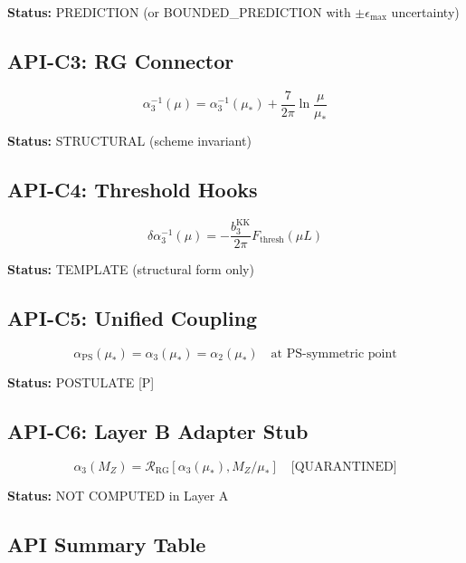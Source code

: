 \documentclass[11pt,a4paper]{article}
\theoremstyle{definition}
\begin{document}
\textbf{Status:} PREDICTION (or BOUNDED\_PREDICTION with $\pm\epsilon_{\max}$ uncertainty)

\subsection{API-C3: RG Connector}
\label{subsec:api-c3}

\begin{equation}
\label{eq:api-c3}
\boxed{\alpha_3^{-1}(\mu) = \alpha_3^{-1}(\mu_*) + \frac{7}{2\pi}\ln\frac{\mu}{\mu_*}}
\end{equation}

\textbf{Status:} STRUCTURAL (scheme invariant)

\subsection{API-C4: Threshold Hooks}
\label{subsec:api-c4}

\begin{equation}
\label{eq:api-c4}
\boxed{\delta\alpha_3^{-1}(\mu) = -\frac{b_3^{\text{KK}}}{2\pi} F_{\text{thresh}}(\mu L)}
\end{equation}

\textbf{Status:} TEMPLATE (structural form only)

\subsection{API-C5: Unified Coupling}
\label{subsec:api-c5}

\begin{equation}
\label{eq:api-c5}
\boxed{\alpha_{\text{PS}}(\mu_*) = \alpha_3(\mu_*) = \alpha_2(\mu_*) \quad \text{at PS-symmetric point}}
\end{equation}

\textbf{Status:} POSTULATE [P]

\subsection{API-C6: Layer B Adapter Stub}
\label{subsec:api-c6}

\begin{equation}
\label{eq:api-c6}
\alpha_3(M_Z) = \mathcal{R}_{\text{RG}}[\alpha_3(\mu_*), M_Z/\mu_*]
  \quad \text{[QUARANTINED]}
\end{equation}

\textbf{Status:} NOT COMPUTED in Layer A

\subsection{API Summary Table}
\label{subsec:api-summary}
\end{document}
